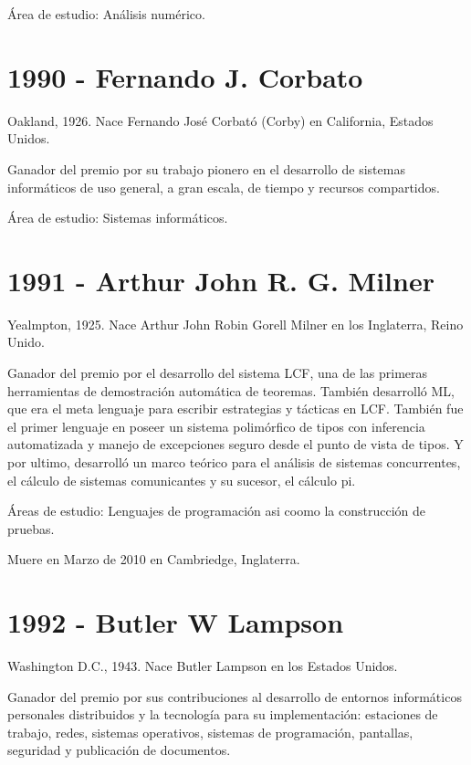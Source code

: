 \documentclass[a4paper, 11pt]{article}
\begin{document}
\noindent Área de estudio: Análisis numérico.
\newline

\section*{1990 - Fernando J. Corbato}
\noindent Oakland, 1926. Nace Fernando José Corbató (Corby) en California, Estados Unidos.

\noindent Ganador del premio por su trabajo pionero en el desarrollo de sistemas informáticos de uso general, a gran escala, de tiempo y recursos compartidos. 

\noindent Área de estudio: Sistemas informáticos.
\newline

\section*{1991 - Arthur John R. G. Milner}
\noindent Yealmpton, 1925. Nace Arthur John Robin Gorell Milner en los Inglaterra, Reino Unido.

\noindent Ganador del premio por el desarrollo del sistema LCF, una de las primeras herramientas de demostración automática de teoremas. También desarrolló ML, que era el meta lenguaje para escribir estrategias y tácticas en LCF. También fue el primer lenguaje en poseer un sistema polimórfico de tipos con inferencia automatizada y manejo de excepciones seguro desde el punto de vista de tipos.
Y por ultimo, desarrolló un marco teórico para el análisis de sistemas concurrentes, el cálculo de sistemas comunicantes y su sucesor, el cálculo pi.


\noindent Áreas de estudio: Lenguajes de programación asi coomo la construcción de pruebas.

\noindent Muere en Marzo de 2010 en Cambriedge, Inglaterra.
\newline

\section*{1992 - Butler W Lampson}
\noindent Washington D.C., 1943. Nace Butler Lampson en los Estados Unidos.

\noindent Ganador del premio por sus contribuciones al desarrollo de entornos informáticos personales distribuidos y la tecnología para su implementación: estaciones de trabajo, redes, sistemas operativos, sistemas de programación, pantallas, seguridad y publicación de documentos.
\end{document}
